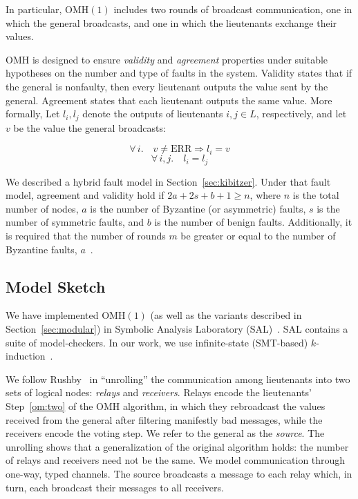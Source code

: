 \documentclass{llncs/llncs}
\newcommand{\OMH}{\ensuremath{\mathrm{OMH}}\xspace}
\newcommand{\ERR}{\ensuremath{\mathrm{ERR}}\xspace}
\newcommand{\lee}[1]{ } %
\newcommand{\lee}[1]{ {\color{blue}$<$lee: #1$>$} } %
\begin{document}
\noindent
In particular, $\OMH(1)$ includes two rounds of broadcast communication, one in which the general broadcasts, and one in which the lieutenants exchange their values.

$\OMH$ is designed to ensure \emph{validity} and \emph{agreement} properties under suitable hypotheses on the number and type of faults in the system. Validity states that if the general is nonfaulty, then every lieutenant outputs the value sent by the general. Agreement states that each lieutenant outputs the same value. More formally, Let $l_i, l_j$ denote the outputs of lieutenants $i, j \in L$, respectively, and let $v$ be the value the general broadcasts:
\noindent
\begin{multicols}{2}
\begin{equation}
  \tag{Validity}
    \forall \,i. \quad v \neq \ERR \Rightarrow l_i = v
\end{equation}\break
\begin{equation}
  \tag{Agreement}
    \forall \,i, j. \quad l_i = l_j
\end{equation}
\end{multicols}
%

%
%

We described a hybrid fault model in Section~\ref{sec:kibitzer}. Under that fault model, agreement and validity hold if $2a+2s+b+1 \geq n$, where $n$ is the total number of nodes, $a$ is the number of Byzantine (or asymmetric) faults, $s$ is the number of symmetric faults, and $b$ is the number of benign faults. Additionally, it is required that the number of rounds $m$ be greater or equal to the number of Byzantine faults, $a$~\cite{Lincoln-Rushby,hybrid}.


\subsection{Model Sketch}\label{sec:sketch}

\lee{we need to mention MJRTY here or in the modular verifiation section}

We have implemented $\OMH(1)$ (as well as the variants described in Section~\ref{sec:modular}) in Symbolic Analysis Laboratory (SAL)~\cite{SAL}. SAL contains a suite of model-checkers. In our work, we use infinite-state (SMT-based) $k$-induction~\cite{cal}.

We follow Rushby~\cite{Rushby:OM1} in ``unrolling'' the communication among lieutenants into two sets of logical nodes: \emph{relays} and \emph{receivers}. Relays encode the lieutenants' Step~\ref{om:two} of the \OMH algorithm, in which they rebroadcast the values received from the general after filtering manifestly bad messages, while the receivers encode the voting step. We refer to the general as the \emph{source}. The unrolling shows that a generalization of the original algorithm holds: the number of relays and receivers need not be the same. We model communication through one-way, typed channels. The source broadcasts a message to each relay which, in turn, each broadcast their messages to all receivers.
\end{document}
